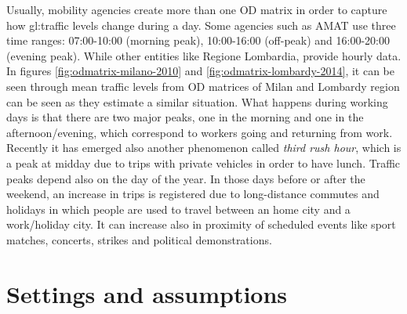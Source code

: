 Usually, mobility agencies create more than one OD matrix in order to capture how \gls{gl:traffic} levels change during a day.
Some agencies such as AMAT use three time ranges: 07:00-10:00 (morning peak), 10:00-16:00 (off-peak) and 16:00-20:00 (evening peak). 
While other entities like Regione Lombardia, provide hourly data.
In figures \ref{fig:odmatrix-milano-2010} and \ref{fig:odmatrix-lombardy-2014}, it can be seen through mean traffic levels from OD matrices of Milan and Lombardy region can be seen as they estimate a similar situation.
What happens during working days is that there are two major peaks, one in the morning and one in the afternoon/evening, which correspond to workers going and returning from work.
Recently it has emerged also another phenomenon called \textit{third rush hour}, which is a peak at midday due to trips with private vehicles in order to have lunch.
Traffic peaks depend also on the day of the year. In those days before or after the weekend, an increase in trips is registered due to long-distance commutes and holidays in which people are used to travel between an home city and a work/holiday city. It can increase also in proximity of scheduled events like sport matches, concerts, strikes and political demonstrations.


\section{Settings and assumptions}

